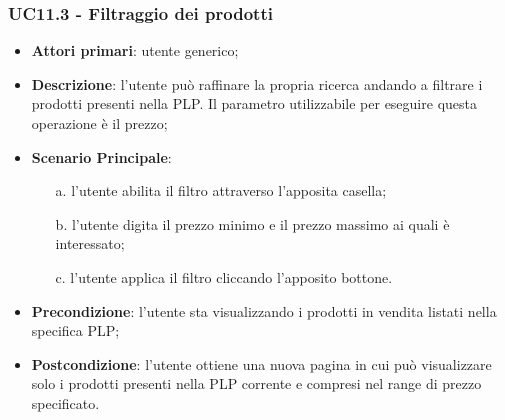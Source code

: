 \subsubsection{UC11.3 - Filtraggio dei prodotti}
\begin{itemize}
\item \textbf{Attori primari}: utente generico;
\item \textbf{Descrizione}: l'utente può raffinare la propria ricerca andando a filtrare i prodotti presenti nella PLP. Il parametro utilizzabile per eseguire questa operazione è il prezzo;
\item \textbf{Scenario Principale}:
\begin{enumerate}
\item[a.] l'utente abilita il filtro attraverso l'apposita casella;
\item[b.] l'utente digita il prezzo minimo e il prezzo massimo ai quali è interessato;
\item[c.] l'utente applica il filtro cliccando l'apposito bottone.
\end{enumerate}
\item \textbf{Precondizione}: l'utente sta visualizzando i prodotti in vendita listati nella specifica PLP;
\item \textbf{Postcondizione}: l'utente ottiene una nuova pagina in cui può visualizzare solo i prodotti presenti nella PLP corrente e compresi nel range di prezzo specificato.
\end{itemize}
